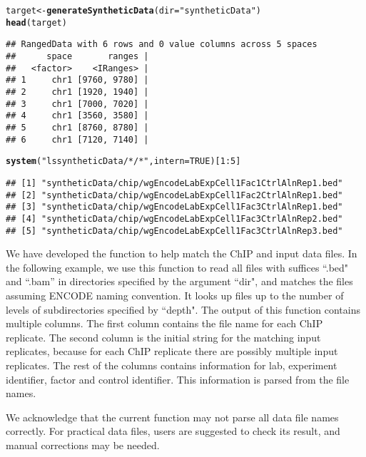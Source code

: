 \documentclass[a4paper,10pt]{article}\usepackage[]{graphicx}\usepackage[]{color}
\makeatletter
\newcommand{\hlnum}[1]{\textcolor[rgb]{0.686,0.059,0.569}{#1}}%
\newcommand{\hlstr}[1]{\textcolor[rgb]{0.192,0.494,0.8}{#1}}%
\newcommand{\hlopt}[1]{\textcolor[rgb]{0,0,0}{#1}}%
\newcommand{\hlstd}[1]{\textcolor[rgb]{0.345,0.345,0.345}{#1}}%
\newcommand{\hlkwb}[1]{\textcolor[rgb]{0.69,0.353,0.396}{#1}}%
\newcommand{\hlkwc}[1]{\textcolor[rgb]{0.333,0.667,0.333}{#1}}%
\newcommand{\hlkwd}[1]{\textcolor[rgb]{0.737,0.353,0.396}{\textbf{#1}}}%
\newenvironment{kframe}{%
 \def\at@end@of@kframe{}%
 \ifinner\ifhmode%
  \def\at@end@of@kframe{\end{minipage}}%
  \begin{minipage}{\columnwidth}%
 \fi\fi%
 \def\FrameCommand##1{\hskip\@totalleftmargin \hskip-\fboxsep
 \colorbox{shadecolor}{##1}\hskip-\fboxsep
     \hskip-\linewidth \hskip-\@totalleftmargin \hskip\columnwidth}%
 \MakeFramed {\advance\hsize-\width
   \@totalleftmargin\z@ \linewidth\hsize
   \@setminipage}}%
 {\par\unskip\endMakeFramed%
 \at@end@of@kframe}
\newenvironment{knitrout}{}{} %
\makeatother
\begin{document}
\begin{knitrout}
\color{fgcolor}\begin{kframe}
\begin{alltt}
\hlstd{target} \hlkwb{<-} \hlkwd{generateSyntheticData}\hlstd{(}\hlkwc{dir} \hlstd{=} \hlstr{"syntheticData"}\hlstd{)}
\hlkwd{head}\hlstd{(target)}
\end{alltt}
\begin{verbatim}
## RangedData with 6 rows and 0 value columns across 5 spaces
##      space       ranges |
##   <factor>    <IRanges> |
## 1     chr1 [9760, 9780] |
## 2     chr1 [1920, 1940] |
## 3     chr1 [7000, 7020] |
## 4     chr1 [3560, 3580] |
## 5     chr1 [8760, 8780] |
## 6     chr1 [7120, 7140] |
\end{verbatim}
\begin{alltt}
\hlkwd{system}\hlstd{(}\hlstr{"ls syntheticData/*/*"}\hlstd{,} \hlkwc{intern} \hlstd{=} \hlnum{TRUE}\hlstd{)[}\hlnum{1}\hlopt{:}\hlnum{5}\hlstd{]}
\end{alltt}
\begin{verbatim}
## [1] "syntheticData/chip/wgEncodeLabExpCell1Fac1CtrlAlnRep1.bed"
## [2] "syntheticData/chip/wgEncodeLabExpCell1Fac2CtrlAlnRep1.bed"
## [3] "syntheticData/chip/wgEncodeLabExpCell1Fac3CtrlAlnRep1.bed"
## [4] "syntheticData/chip/wgEncodeLabExpCell1Fac3CtrlAlnRep2.bed"
## [5] "syntheticData/chip/wgEncodeLabExpCell1Fac3CtrlAlnRep3.bed"
\end{verbatim}
\end{kframe}
\end{knitrout}

We have developed the  function to help match the ChIP and input data files. In the following example, we use this function to read all files with suffices ``.bed" and ``.bam'' in directories specified by the argument ``dir", and matches the files assuming ENCODE naming convention. It looks up files up to the number of levels of subdirectories specified by ``depth". The output of this function contains multiple columns. The first column contains the file name for each ChIP replicate. The second column is the initial string for the matching input replicates, because for each ChIP replicate there are possibly multiple input replicates. The rest of the columns contains information for lab, experiment identifier, factor and control identifier. This information is parsed from the file names.

We acknowledge that the current function may not parse all data file names correctly. For practical data files, users are suggested to check its result, and manual corrections may be needed.
\end{document}
